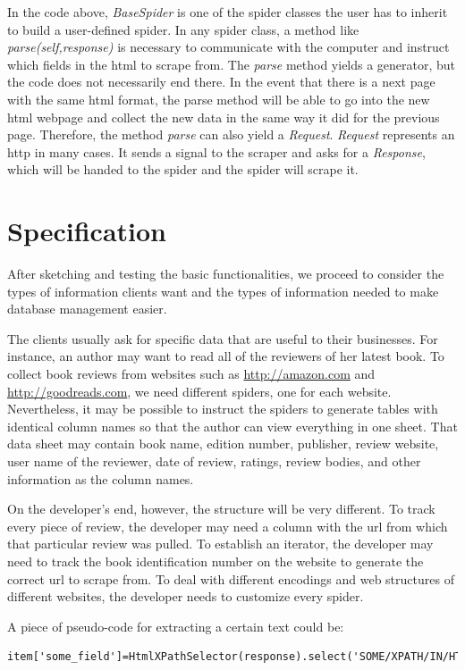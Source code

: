 \documentclass[12pt]{report}
\begin{document}
In the code above, \textit{BaseSpider} is one of the spider classes the user has to inherit to build a user-defined spider. In any spider class, a method like \textit{parse(self,response)} is necessary to communicate with the computer and instruct which fields in the html to scrape from. The \textit{parse} method yields a generator, but the code does not necessarily end there. In the event that there is a next page with the same html format, the parse method will be able to go into the new html webpage and collect the new data in the same way it did for the previous page. Therefore, the method \textit{parse} can also yield a \textit{Request}. \textit{Request} represents an \gls{http} in many cases. It sends a signal to the scraper and asks for a \textit{Response}, which will be handed to the spider and the spider will scrape it.

\section{Specification}

After sketching and testing the basic functionalities, we proceed to consider the types of information clients want and the types of information needed to make database management easier. 

The clients usually ask for specific data that are useful to their businesses. For instance, an author may want to read all of the reviewers of her latest book. To collect book reviews from websites such as \url{http://amazon.com} and \url{http://goodreads.com}, we need different spiders, one for each website. Nevertheless, it may be possible to instruct the spiders to generate tables with identical column names so that the author can view everything in one sheet. That data sheet may contain book name, edition number, publisher, review website, user name of the reviewer, date of review, ratings, review bodies, and other information as the column names.

On the developer's end, however, the structure will be very different. To track every piece of review, the developer may need a column with the url from which that particular review was pulled. To establish an iterator, the developer may need to track the book identification number on the website to generate the correct url to scrape from. To deal with different encodings and web structures of different websites, the developer needs to customize every spider.

A piece of pseudo-code for extracting a certain text could be:
\begin{lstlisting}
item['some_field']=HtmlXPathSelector(response).select('SOME/XPATH/IN/HTML/text()').extract()
\end{lstlisting}
\end{document}
